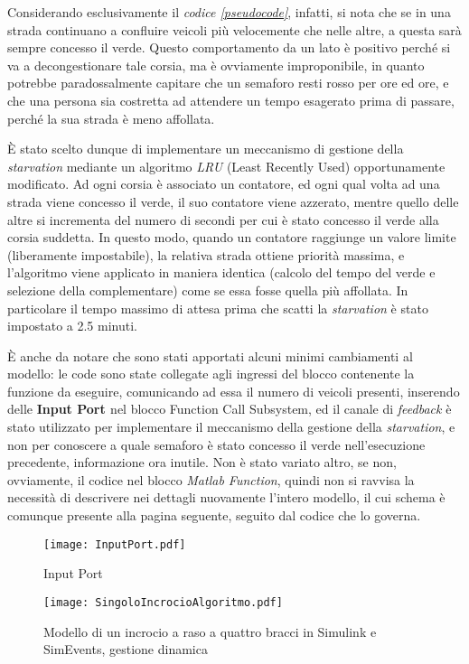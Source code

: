 Considerando esclusivamente il \textit{codice \ref{pseudocode}}, infatti, si nota che se in una strada continuano a confluire veicoli più velocemente che nelle altre, a questa sarà sempre concesso il verde. Questo comportamento da un lato è positivo perché si va a decongestionare tale corsia, ma è ovviamente improponibile, in quanto potrebbe paradossalmente capitare che un semaforo resti rosso per ore ed ore, e che una persona sia costretta ad attendere un tempo esagerato prima di passare, perché la sua strada è meno affollata.

È stato scelto dunque di implementare un meccanismo di gestione della \textit{starvation} mediante un algoritmo \textit{LRU} (Least Recently Used) opportunamente modificato. Ad ogni corsia è associato un contatore, ed ogni qual volta ad una strada viene concesso il verde, il suo contatore viene azzerato, mentre quello delle altre si incrementa del numero di secondi per cui è stato concesso il verde alla corsia suddetta. In questo modo, quando un contatore raggiunge un valore limite (liberamente impostabile), la relativa strada ottiene priorità massima, e l’algoritmo viene applicato in maniera identica (calcolo del tempo del verde e selezione della complementare) come se essa fosse quella più affollata. In particolare il tempo massimo di attesa prima che scatti la \textit{starvation} è stato impostato a 2.5 minuti.

È anche da notare che sono stati apportati alcuni minimi cambiamenti al modello: le code sono state collegate agli ingressi del blocco contenente la funzione da eseguire, comunicando ad essa il numero di veicoli presenti, inserendo delle \textbf{Input Port \cite{inputport}} nel blocco Function Call Subsystem, ed il canale di \textit{feedback} è stato utilizzato per implementare il meccanismo della gestione della \textit{starvation}, e non per conoscere a quale semaforo è stato concesso il verde nell’esecuzione precedente, informazione ora inutile. Non è stato variato altro, se non, ovviamente, il codice nel blocco \textit{Matlab Function}, quindi non si ravvisa la necessità di descrivere nei dettagli nuovamente l'intero modello, il cui schema è comunque presente alla pagina seguente, seguito dal codice che lo governa.
\newline
\begin{figure}[H]
\centering
  \texttt{[image: InputPort.pdf]}
  \caption{Input Port}
  \label{fig:inputport}
\end{figure}

\begin{figure}[H]
  \texttt{[image: SingoloIncrocioAlgoritmo.pdf]}
  \caption{Modello di un incrocio a raso a quattro bracci in Simulink e SimEvents, gestione dinamica}
  \label{fig:modellosingoloincrocioalgoritmo}
\end{figure}
\newpage

